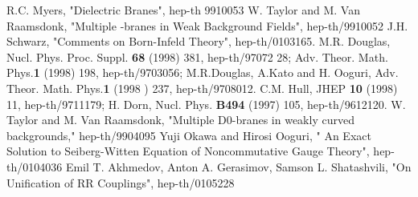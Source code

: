 \documentclass[a4paper,12pt]{article}
\begin{document}
\begin{thebibliography}{8}

 R.C. Myers, "Dielectric Branes", hep-th 9910053  
W. Taylor and M. Van Raamsdonk, "Multiple \coordHE{}-branes in Weak Background   Fields", hep-th/9910052 
 J.H. Schwarz, "Comments on Born-Infeld Theory", hep-th/0103165.
 M.R. Douglas, Nucl. Phys. Proc. Suppl. \textbf{68} (1998) 381, hep-th/97072    28; 
   Adv.     Theor. Math. Phys.\textbf{1} (1998) 198, hep-th/9703056; M.R.Douglas, A.Kato  and      H. Ooguri, 
 Adv. Theor. Math. Phys.\textbf{1} (1998     ) 237, hep-th/9708012. 
 C.M. Hull, JHEP \textbf{10} (1998) 11, hep-th/9711179; H. Dorn, Nucl. Phys. \textbf{B494} (1997) 105, hep-th/9612120. 
 W. Taylor and M. Van Raamsdonk, "Multiple D0-branes in weakly curved backgrounds," hep-th/9904095 
 Yuji Okawa and Hirosi Ooguri, " An Exact Solution to Seiberg-Witten Equation of Noncommutative Gauge Theory", hep-th/0104036 
  Emil T. Akhmedov, Anton A. Gerasimov, Samson L. Shatashvili, "On Unification of RR Couplings", hep-th/0105228
\end{thebibliography}
\end{document}
